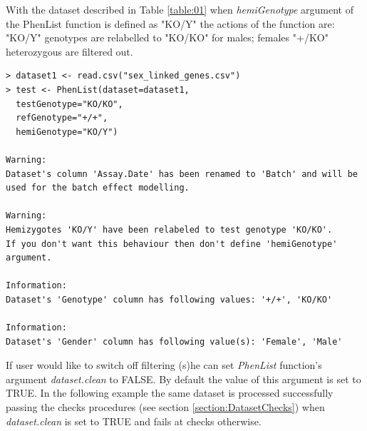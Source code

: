 \documentclass[12pt,a4paper]{article}
\begin{document}
With the dataset described in Table \ref{table:01} when \textit{hemiGenotype} argument of the PhenList function is defined as "KO\slash Y" the actions of the function are:  "KO/Y" genotypes are relabelled to "KO/KO" for males;  females "+\slash KO" heterozygous are filtered out. 

\begingroup
    \fontsize{8pt}{12pt}\selectfont
\begin{verbatim}
> dataset1 <- read.csv("sex_linked_genes.csv")
> test <- PhenList(dataset=dataset1,
  testGenotype="KO/KO",
  refGenotype="+/+",
  hemiGenotype="KO/Y")
  
Warning:
Dataset's column 'Assay.Date' has been renamed to 'Batch' and will be used for the batch effect modelling.

Warning:
Hemizygotes 'KO/Y' have been relabeled to test genotype 'KO/KO'.
If you don't want this behaviour then don't define 'hemiGenotype' argument.

Information:
Dataset's 'Genotype' column has following values: '+/+', 'KO/KO'

Information:
Dataset's 'Gender' column has following value(s): 'Female', 'Male'
\end{verbatim}
\endgroup

If user would like to switch off filtering (s)he can set \textit{PhenList} function's argument \textit{dataset.clean} to FALSE. By default the value of this argument is set to TRUE. 
In the following example the same dataset is processed successfully passing the checks procedures (see section \ref{section:DatasetChecks}) when \textit{dataset.clean} is set to TRUE and fails at checks otherwise.
\end{document}
